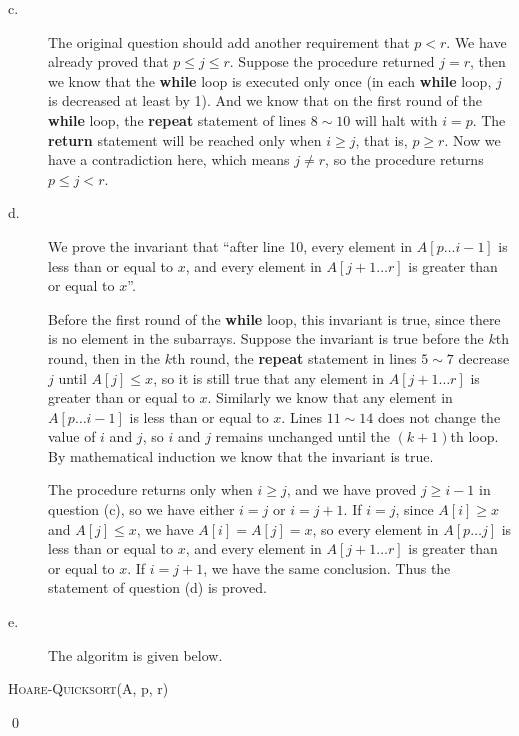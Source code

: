 \begin{description}
\item[c. \hspace{9pt}] The original question should add another requirement that $p < r$. We have already proved that $p \leq j \leq r$. Suppose the procedure returned $j = r$, then
we know that the \textbf{while} loop is executed only once (in each \textbf{while} loop, $j$ is decreased at least by 1). And we know that on the first round of the \textbf{while}
loop, the \textbf{repeat} statement of lines $8 \sim 10$ will halt with $i = p$. The \textbf{return} statement will be reached only when $i \geq j$, that is, $p \geq r $. Now we have
a contradiction here, which means $j \neq r$, so the procedure returns $p \leq j < r$.

\item[d. \hspace{9pt}] We prove the invariant that ``after line 10, every element in $A[p \ldots i - 1]$ is less than or equal to $x$, and every element in $A[j + 1 \ldots r]$ is greater than
or equal to $x$''.

Before the first round of the \textbf{while} loop, this invariant is true, since there is no element in the subarrays. Suppose the invariant is true before the $k$th round, then in the $k$th
round, the \textbf{repeat} statement in lines $5 \sim 7$ decrease $j$ until $A[j] \leq x$, so it is still true that any element in $A[j + 1 \ldots r]$ is greater than or equal to $x$.
Similarly we know that any element in $A[p \ldots i - 1]$ is less than or equal to $x$. Lines $11\sim 14$ does not change the value of $i$ and $j$, so $i$ and $j$ remains unchanged until
the $(k + 1)$th loop. By mathematical induction we know that the invariant is true.

The procedure returns only when $i \geq j$, and we have proved $j \geq i - 1$ in question (c), so we have either $i = j$ or $i = j + 1$. If $i = j$, since $A[i] \geq x$ and $A[j] \leq x$, 
we have $A[i] = A[j] = x$, so every element in $A[p \ldots j]$ is less than or equal to $x$, and every element in $A[j + 1 \ldots r]$ is greater than or equal to $x$. If $i = j + 1$,
we have the same conclusion. Thus the statement of question (d) is proved.

\item[e. \hspace{9pt}] The algoritm is given below.

\end{description}
\begin{algorithm}[H]
\caption{\textsc{Hoare-Quicksort}(A, p, r)}
\end{algorithm}
\qed

